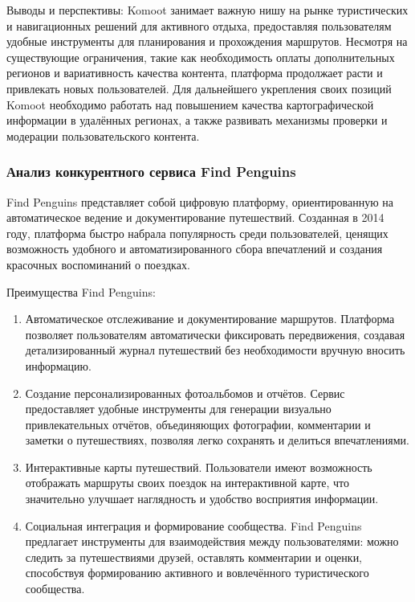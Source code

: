 Выводы и перспективы:
Komoot занимает важную нишу на рынке туристических и навигационных решений для активного отдыха, предоставляя пользователям удобные инструменты для планирования и прохождения маршрутов. Несмотря на существующие ограничения, такие как необходимость оплаты дополнительных регионов и вариативность качества контента, платформа продолжает расти и привлекать новых пользователей. Для дальнейшего укрепления своих позиций Komoot необходимо работать над повышением качества картографической информации в удалённых регионах, а также развивать механизмы проверки и модерации пользовательского контента.

\subsubsection*{Анализ конкурентного сервиса Find Penguins}
Find Penguins представляет собой цифровую платформу, ориентированную на автоматическое ведение и документирование путешествий. Созданная в 2014 году, платформа быстро набрала популярность среди пользователей, ценящих возможность удобного и автоматизированного сбора впечатлений и создания красочных воспоминаний о поездках.

Преимущества Find Penguins:
\begin{enumerate}
    \item Автоматическое отслеживание и документирование маршрутов. Платформа позволяет пользователям автоматически фиксировать передвижения, создавая детализированный журнал путешествий без необходимости вручную вносить информацию.
    \item Создание персонализированных фотоальбомов и отчётов. Сервис предоставляет удобные инструменты для генерации визуально привлекательных отчётов, объединяющих фотографии, комментарии и заметки о путешествиях, позволяя легко сохранять и делиться впечатлениями.
    \item Интерактивные карты путешествий. Пользователи имеют возможность отображать маршруты своих поездок на интерактивной карте, что значительно улучшает наглядность и удобство восприятия информации.
    \item Социальная интеграция и формирование сообщества. Find Penguins предлагает инструменты для взаимодействия между пользователями: можно следить за путешествиями друзей, оставлять комментарии и оценки, способствуя формированию активного и вовлечённого туристического сообщества.
\end{enumerate}

